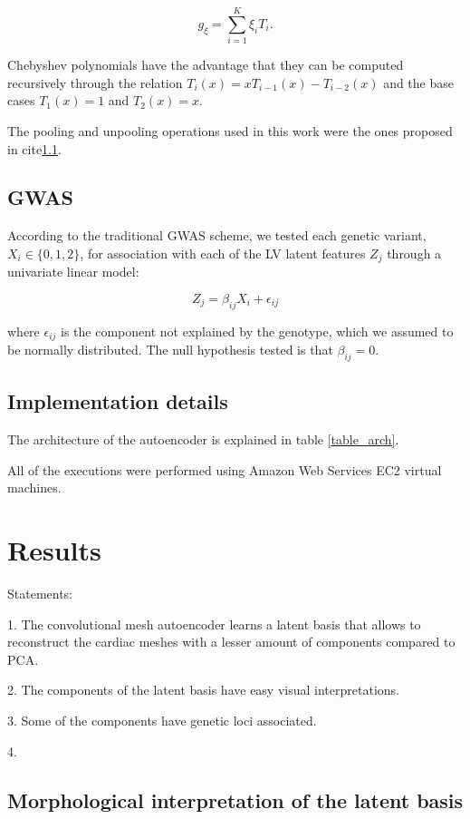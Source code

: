 \documentclass[twocolumn]{llncs}
\begin{document}
\begin{equation}
g_{\xi}=\sum_{i=1}^{K}\xi_i T_i.
\end{equation}

Chebyshev polynomials have the advantage that they can be computed recursively through the relation $T_i(x)=xT_{i-1}(x)-T_{i-2}(x)$ and the base cases $T_1(x)=1$ and $T_2(x)=x$.

The pooling and unpooling operations used in this work were the ones proposed in cite{\ref{}}.

\subsection{GWAS}
According to the traditional GWAS scheme, we tested each genetic variant, $X_i\in\{0,1,2\}$, for association with each of the LV latent features $Z_j$ through a univariate linear model:

\begin{equation}
Z_j = \beta_{ij}X_i+\epsilon_{ij}
\end{equation}

\noindent where $\epsilon_{ij}$ is the component not explained by the genotype, which we assumed to be normally distributed. The null hypothesis tested is that $\beta_{ij}=0$.

\subsection{Implementation details}
The architecture of the autoencoder is explained in table \ref{table_arch}.

All of the executions were performed using Amazon Web Services EC2 virtual machines.

\section{Results}
Statements:

1. The convolutional mesh autoencoder learns a latent basis that allows to reconstruct the cardiac meshes with a lesser amount of components compared to PCA.

2. The components of the latent basis have easy visual interpretations.

3. Some of the components have genetic loci associated. 

4. 

\subsection{Morphological interpretation of the latent basis}
\end{document}
